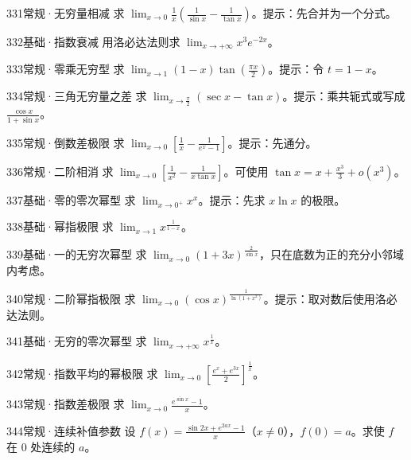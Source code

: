 \begin{exercise}{331}{常规·无穷量相减}
求 $\lim_{x\to0}\frac1x(\frac{1}{\sin x}-\frac{1}{\tan x})$。提示：先合并为一个分式。
\end{exercise}
\begin{exercise}{332}{基础·指数衰减}
用洛必达法则求 $\lim_{x\to+\infty}x^3e^{-2x}$。
\end{exercise}
\begin{exercise}{333}{常规·零乘无穷型}
求 $\lim_{x\to1}(1-x)\tan(\frac{\pi x}{2})$。提示：令 $t=1-x$。
\end{exercise}
\begin{exercise}{334}{常规·三角无穷量之差}
求 $\lim_{x\to\frac{\pi}{2}}(\sec x-\tan x)$。提示：乘共轭式或写成 $\frac{\cos x}{1+\sin x}$。
\end{exercise}
\begin{exercise}{335}{常规·倒数差极限}
求 $\lim_{x\to0}[\frac{1}{x}-\frac{1}{e^x-1}]$。提示：先通分。
\end{exercise}
\begin{exercise}{336}{常规·二阶相消}
求 $\lim_{x\to0}[\frac{1}{x^2}-\frac{1}{x\tan x}]$。可使用 $\tan x=x+\frac{x^3}{3}+o(x^3)$。
\end{exercise}
\begin{exercise}{337}{基础·零的零次幂型}
求 $\lim_{x\to0^+}x^x$。提示：先求 $x\ln x$ 的极限。
\end{exercise}
\begin{exercise}{338}{基础·幂指极限}
求 $\lim_{x\to1}x^{\frac{1}{1-x}}$。
\end{exercise}
\begin{exercise}{339}{基础·一的无穷次幂型}
求 $\lim_{x\to0}(1+3x)^{\frac{2}{\sin x}}$，只在底数为正的充分小邻域内考虑。
\end{exercise}
\begin{exercise}{340}{常规·二阶幂指极限}
求 $\lim_{x\to0}(\cos x)^{\frac{1}{\ln(1+x^2)}}$。提示：取对数后使用洛必达法则。
\end{exercise}
\begin{exercise}{341}{基础·无穷的零次幂型}
求 $\lim_{x\to+\infty}x^{\frac{1}{x}}$。
\end{exercise}
\begin{exercise}{342}{常规·指数平均的幂极限}
求 $\lim_{x\to0}[\frac{e^x+e^{3x}}{2}]^{\frac{1}{x}}$。
\end{exercise}
\begin{exercise}{343}{常规·指数差极限}
求 $\lim_{x\to0}\frac{e^{\sin x}-1}{x}$。
\end{exercise}
\begin{exercise}{344}{常规·连续补值参数}
设 $f(x)=\frac{\sin2x+e^{2ax}-1}{x}$（$x\ne0$），$f(0)=a$。求使 $f$ 在 $0$ 处连续的 $a$。
\end{exercise}
